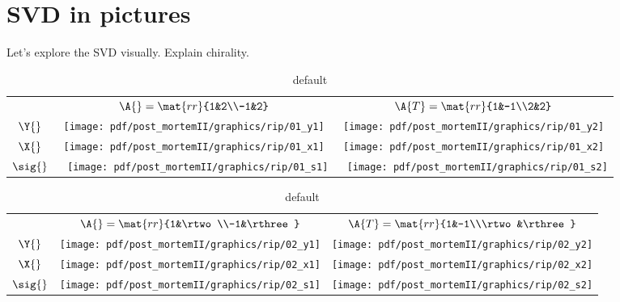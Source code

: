 \section{SVD in pictures}
Let's explore the SVD visually.
Explain chirality.

\begin{table}[htdp]
\begin{center}
\begin{tabular}{ccc}
 & $\A{}=\mat{rr}{1&2\\-1&2}$ & $\A{T} = \mat{rr}{1&-1\\2&2} $ \\[35pt]
 $\Y{}$   & \qquad \texttt{[image: pdf/post\_mortemII/graphics/rip/01\_y1]} 
          & \qquad \texttt{[image: pdf/post\_mortemII/graphics/rip/01\_y2]} \\[15pt]
 $\X{}$   & \qquad \texttt{[image: pdf/post\_mortemII/graphics/rip/01\_x1]}
          & \qquad \texttt{[image: pdf/post\_mortemII/graphics/rip/01\_x2]} \\[20pt]
 $\sig{}$ & \,\,   \texttt{[image: pdf/post\_mortemII/graphics/rip/01\_s1]}
          & \,\,   \texttt{[image: pdf/post\_mortemII/graphics/rip/01\_s2]} \\[20pt]
\end{tabular}
\end{center}
\label{tab:pmII:visualsa}
\caption{default}
\end{table}%
\clearpage

\begin{table}[htdp]
\begin{center}
\begin{tabular}{ccc}
 & $\A{}=\mat{rr}{1&\rtwo\\-1&\rthree}$ & $\A{T} = \mat{rr}{1&-1\\\rtwo&\rthree} $ \\[35pt]
 $\Y{}$   & \qquad \texttt{[image: pdf/post\_mortemII/graphics/rip/02\_y1]} 
          & \qquad \texttt{[image: pdf/post\_mortemII/graphics/rip/02\_y2]} \\[15pt]
 $\X{}$   & \qquad \texttt{[image: pdf/post\_mortemII/graphics/rip/02\_x1]}
          & \qquad \texttt{[image: pdf/post\_mortemII/graphics/rip/02\_x2]} \\[20pt]
 $\sig{}$ &        \texttt{[image: pdf/post\_mortemII/graphics/rip/02\_s1]}
          &        \texttt{[image: pdf/post\_mortemII/graphics/rip/02\_s2]} \\[20pt]
\end{tabular}
\end{center}
\label{tab:pmII:visualsb}
\caption{default}
\end{table}%
\clearpage

